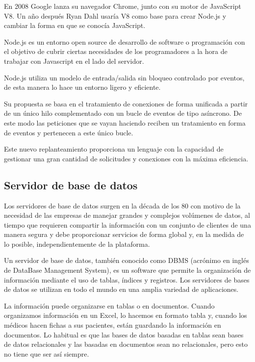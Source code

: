 En 2008 Google lanza su navegador Chrome, junto con su motor de JavaScript V8. Un año después Ryan Dahl usaría V8 como base para crear Node.js y cambiar la forma en que se conocía JavaScript.

Node.js es un entorno open source de desarrollo de software o programación con el objetivo de cubrir ciertas necesidades de los programadores a la hora de trabajar con Javascript en el lado del servidor.

Node.js utiliza un modelo de entrada/salida sin bloqueo controlado por eventos, de esta manera lo hace un entorno ligero y eficiente.

Su propuesta se basa en el tratamiento de conexiones de forma unificada a partir de un único hilo complementado con un bucle de eventos de tipo asíncrono. De este modo las peticiones que se vayan haciendo reciben un tratamiento en forma de eventos y pertenecen a este único bucle.

Este nuevo replanteamiento proporciona un lenguaje con la capacidad de gestionar una gran cantidad de solicitudes y conexiones con la máxima eficiencia.

\subsection{Servidor de base de datos}

Los servidores de base de datos surgen en la década de los 80 con motivo de la necesidad de las empresas de manejar grandes y complejos volúmenes de datos, al tiempo que requieren compartir la información con un conjunto de clientes de una manera segura y debe proporcionar servicios de forma global y, en la medida de lo posible, independientemente de la plataforma.

Un servidor de base de datos, también conocido como DBMS (acrónimo en inglés de DataBase Management System), es un software que permite la organización de información mediante el uso de tablas, índices y registros. Los servidores de bases de datos se utilizan en todo el mundo en una amplia variedad de aplicaciones.

La información puede organizarse en tablas o en documentos. Cuando organizamos información en un Excel, lo hacemos en formato tabla y, cuando los médicos hacen fichas a sus pacientes, están guardando la información en documentos. Lo habitual es que las bases de datos basadas en tablas sean bases de datos relacionales y las basadas en documentos sean no relacionales, pero esto no tiene que ser así siempre.

